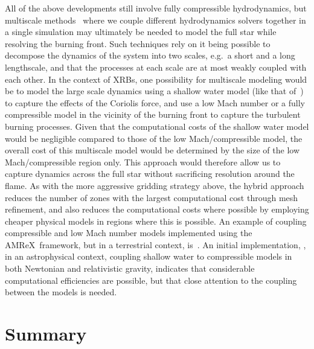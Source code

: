 \documentclass[a4paper]{jpconf}
\newcommand{\amrex}{{\sffamily AMReX}}
\newcommand{\MarginPar}[1]{\marginpar{\vskip-\baselineskip\raggedright\tiny\sffamily\hrule\smallskip{\color{red}#1}\par\smallskip\hrule}}
\begin{document}
All of the above developments still involve fully compressible
hydrodynamics, but multiscale methods~\cite{weinan2011principles}
where we couple different hydrodynamics solvers together in a single
simulation may ultimately be needed to model the full star while
resolving the burning front.
Such techniques rely on it being possible to decompose the dynamics of
the system into two scales, e.g.~a short and a long lengthscale, and
that the processes at each scale are at most weakly coupled with each
other. In the context of XRBs, one possibility for multiscale modeling
would be to model the large scale dynamics using a shallow water model
(like that of~\cite{SPIT_ETAL02}) to capture the effects of the
Coriolis force, and use a low Mach number or a fully compressible
model in the vicinity of the burning front to capture the turbulent
burning processes. Given that the computational costs of the shallow
water model would be negligible compared to those of the low
Mach/compressible model, the overall cost of this multiscale model
would be determined by the size of the low Mach/compressible region
only. This approach would therefore allow us to capture dynamics
across the full star without sacrificing resolution around the flame.
As with the more aggressive gridding strategy above, the hybrid
approach reduces the number of zones with the largest computational
cost through mesh refinement, and also reduces the computational costs
where possible by employing cheaper physical models in regions where
this is possible.  An example of coupling compressible and low Mach
number models implemented using the \amrex~framework, but in a
terrestrial context, is~\cite{Motheau2018}. An initial implementation,
\cite{Harpole2018}, in an astrophysical context, coupling shallow
water to compressible models in both Newtonian and relativistic
gravity, indicates that considerable computational efficiencies are
possible, but that close attention to the coupling between the models
is needed.  



\section{Summary}
\end{document}
